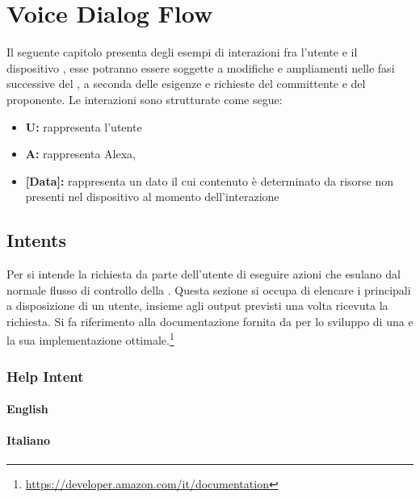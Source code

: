 \chapter{Voice Dialog Flow}

Il seguente capitolo presenta degli esempi di interazioni fra l'utente e il dispositivo , esse potranno essere soggette a modifiche e ampliamenti nelle fasi successive del  , a seconda delle esigenze e richieste del committente e del proponente.
Le interazioni sono strutturate come segue:
\begin{itemize}
	\item \textbf{U:} rappresenta l'utente
	\item \textbf{A:} rappresenta Alexa,
	\item \textbf{[Data]:} rappresenta un dato il cui contenuto è determinato da risorse non presenti nel dispositivo al momento dell'interazione
\end{itemize}


\section{Intents}
Per  si intende la richiesta da parte dell'utente di eseguire azioni che esulano dal normale flusso di controllo della .
Questa sezione si occupa di elencare i principali  a disposizione di un utente, insieme agli output previsti una volta ricevuta la richiesta.
Si fa riferimento alla documentazione fornita da  per lo sviluppo di una  e la sua implementazione ottimale.\footnote{\url{https://developer.amazon.com/it/documentation}}


\subsection{Help Intent}
\subsubsection{English}
\begin{itemize}
\end{itemize}
\subsubsection{Italiano}
	\begin{itemize}
	\end{itemize}

